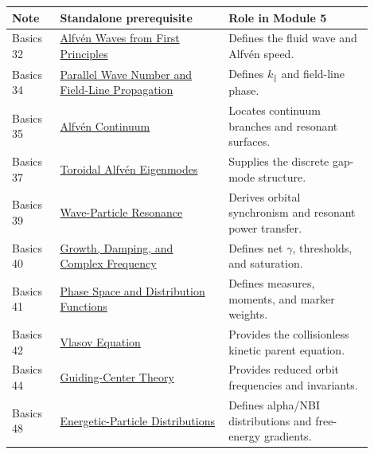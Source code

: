 \documentclass[11pt]{article}
\begin{document}
\begin{longtable}{p{0.12\linewidth} p{0.42\linewidth} p{0.36\linewidth}}
\toprule
\textbf{Note} & \textbf{Standalone prerequisite} & \textbf{Role in Module 5}\\
\midrule
Basics 32 & \href{run:basics/basics_32_alfven_waves_from_first_principles.pdf}{Alfv\'en Waves from First Principles} & Defines the fluid wave and Alfv\'en speed.\\
Basics 34 & \href{run:basics/basics_34_parallel_wave_number_and_field_line_propagation.pdf}{Parallel Wave Number and Field-Line Propagation} & Defines $k_\parallel$ and field-line phase.\\
Basics 35 & \href{run:basics/basics_35_alfven_continuum.pdf}{Alfv\'en Continuum} & Locates continuum branches and resonant surfaces.\\
Basics 37 & \href{run:basics/basics_37_toroidal_alfven_eigenmodes.pdf}{Toroidal Alfv\'en Eigenmodes} & Supplies the discrete gap-mode structure.\\
Basics 39 & \href{run:basics/basics_39_wave_particle_resonance.pdf}{Wave-Particle Resonance} & Derives orbital synchronism and resonant power transfer.\\
Basics 40 & \href{run:basics/basics_40_growth_damping_and_complex_frequency.pdf}{Growth, Damping, and Complex Frequency} & Defines net $\gamma$, thresholds, and saturation.\\
Basics 41 & \href{run:basics/basics_41_phase_space_and_distribution_functions.pdf}{Phase Space and Distribution Functions} & Defines measures, moments, and marker weights.\\
Basics 42 & \href{run:basics/basics_42_vlasov_equation.pdf}{Vlasov Equation} & Provides the collisionless kinetic parent equation.\\
Basics 44 & \href{run:basics/basics_44_guiding_center_theory.pdf}{Guiding-Center Theory} & Provides reduced orbit frequencies and invariants.\\
Basics 48 & \href{run:basics/basics_48_energetic_particle_distributions.pdf}{Energetic-Particle Distributions} & Defines alpha/NBI distributions and free-energy gradients.\\
\bottomrule
\end{longtable}
\end{document}
